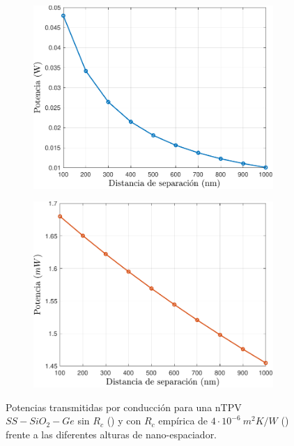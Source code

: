\begin{figure}[H]
	\centering
	\begin{subfigure}[b]{0.49\textwidth}
		\centering
			\includegraphics[width=1.00\textwidth]{Pn_SsSiO2Ge.pdf}
		\caption{ }
		\label{fig:Pn_SsSiO2Ge}
	\end{subfigure}
	\hfill
	\begin{subfigure}[b]{0.49\textwidth}
		\centering
			\includegraphics[width=1.00\textwidth]{Prc_SsSiO2Ge_Emp.pdf}
		\caption{ }
		\label{fig:Prc_SsSiO2Ge_Emp}
	\end{subfigure}
	\caption{Potencias transmitidas por conducción para una nTPV $SS-SiO_2-Ge$ sin $R_c$ () y con $R_c$ empírica de $4\cdot 10^{-6} \ m^2 K/W$ () frente a las diferentes alturas de nano-espaciador.}
	\label{fig:Pcond1_SsSiO2Ge}
\end{figure}
